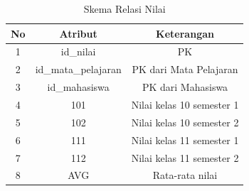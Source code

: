 \begin{enumerate}
        \begin{table}[H]
            \centering
            \begin{tabular}{|c|c|c|}
                \hline
                No & Atribut & Keterangan \\
                \hline
                1 & id\_nilai & PK \\
                \hline
                2 & id\_mata\_pelajaran & PK dari Mata Pelajaran \\
                \hline
                3 & id\_mahasiswa & PK dari Mahasiswa \\
                \hline
                4 & 101 & Nilai kelas 10 semester 1 \\
                \hline
                5 & 102 & Nilai kelas 10 semester 2 \\
                \hline
                6 & 111 & Nilai kelas 11 semester 1 \\
                \hline
                7 & 112 & Nilai kelas 11 semester 2 \\
                \hline
                8 & AVG & Rata-rata nilai \\
                \hline
            \end{tabular}
            \caption{Skema Relasi Nilai}
            \label{tab:skema relasi nilai}
        \end{table}
\end{enumerate}



